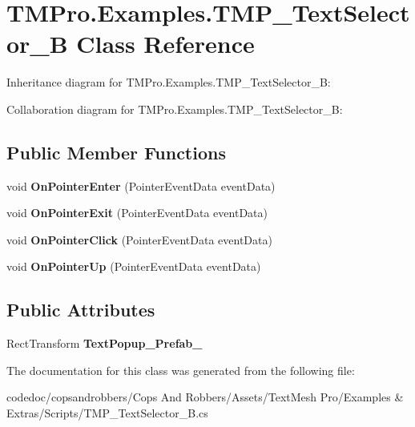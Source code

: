 \hypertarget{classTMPro_1_1Examples_1_1TMP__TextSelector__B}{}\section{T\+M\+Pro.\+Examples.\+T\+M\+P\+\_\+\+Text\+Selector\+\_\+B Class Reference}
\label{classTMPro_1_1Examples_1_1TMP__TextSelector__B}


Inheritance diagram for T\+M\+Pro.\+Examples.\+T\+M\+P\+\_\+\+Text\+Selector\+\_\+B\+:


Collaboration diagram for T\+M\+Pro.\+Examples.\+T\+M\+P\+\_\+\+Text\+Selector\+\_\+B\+:
\subsection*{Public Member Functions}
\begin{DoxyCompactItemize}
\item 
\mbox{\label{classTMPro_1_1Examples_1_1TMP__TextSelector__B_ae7830c3581122852db867ca0e728c2a8}} 
void {\bfseries On\+Pointer\+Enter} (Pointer\+Event\+Data event\+Data)
\item 
\mbox{\label{classTMPro_1_1Examples_1_1TMP__TextSelector__B_adaec8e4a30998ce95981f29f92ced137}} 
void {\bfseries On\+Pointer\+Exit} (Pointer\+Event\+Data event\+Data)
\item 
\mbox{\label{classTMPro_1_1Examples_1_1TMP__TextSelector__B_ad0a0f7e8a9485a0980bb873f31e18e41}} 
void {\bfseries On\+Pointer\+Click} (Pointer\+Event\+Data event\+Data)
\item 
\mbox{\label{classTMPro_1_1Examples_1_1TMP__TextSelector__B_a2e36cc0ea424f43ad1e4ca6e3cdcf1b0}} 
void {\bfseries On\+Pointer\+Up} (Pointer\+Event\+Data event\+Data)
\end{DoxyCompactItemize}
\subsection*{Public Attributes}
\begin{DoxyCompactItemize}
\item 
\mbox{\label{classTMPro_1_1Examples_1_1TMP__TextSelector__B_afab51f8e6ae2f2c170a2fbee569f29d7}} 
Rect\+Transform {\bfseries Text\+Popup\+\_\+\+Prefab\+\_}
\end{DoxyCompactItemize}


The documentation for this class was generated from the following file\+:\begin{DoxyCompactItemize}
\item 
codedoc/copsandrobbers/\+Cops And Robbers/\+Assets/\+Text\+Mesh Pro/\+Examples \& Extras/\+Scripts/T\+M\+P\+\_\+\+Text\+Selector\+\_\+\+B.\+cs\end{DoxyCompactItemize}
